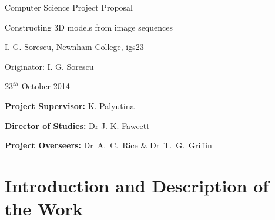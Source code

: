 
\vfil

\centerline{\Large Computer Science Project Proposal}
\vspace{0.4in}
\centerline{\Large Constructing 3D models from image sequences}
\vspace{0.4in}
\centerline{\large I. G. Sorescu, Newnham College, igs23}
\vspace{0.3in}
\centerline{\large Originator: I. G. Sorescu}
\vspace{0.3in}
\centerline{\large 23$^{th}$ October 2014}

\vfil


\noindent
{\bf Project Supervisor:} K. Palyutina
\vspace{0.2in}

\noindent
{\bf Director of Studies:} Dr J. K. Fawcett
\vspace{0.2in}
\noindent
 
\noindent
{\bf Project Overseers:} Dr~A.~C.~Rice  \& Dr~T.~G.~Griffin



\section*{Introduction and Description of the Work}

